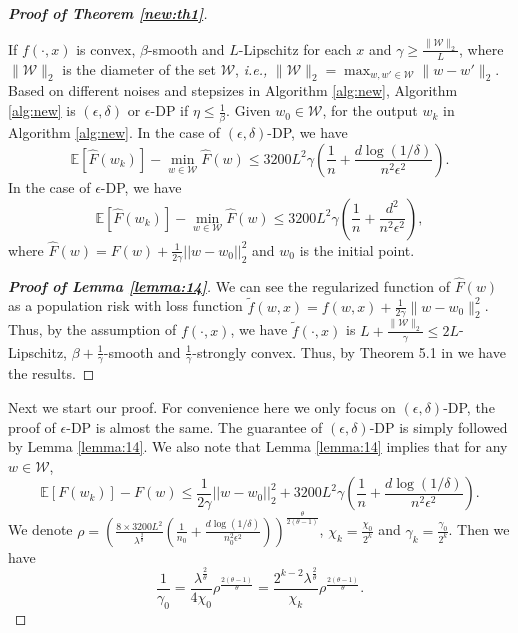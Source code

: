 \documentclass[12pt]{alt2022} %
\renewcommand{\tilde}{\widetilde}
\begin{document}
\begin{proof}[ {\bf Proof of Theorem \ref{new:th1}}]
	    \begin{lemma}\label{lemma:14}
	    If $f(\cdot, x)$ is  convex, $\beta$-smooth and $L$-Lipschitz for each $x$ and $\gamma \geq \frac{\|\mathcal{W}\|_2}{L}$, where $\|\mathcal{W}\|_2$ is the diameter of the set $\mathcal{W}$, {\em i.e.,} $\|\mathcal{W}\|_2=\max_{w, w'\in \mathcal{W}}\|w-w'\|_2$.  
	    Based on different noises and stepsizes in Algorithm \ref{alg:new},  Algorithm \ref{alg:new} is $(\epsilon, \delta)$ or $\epsilon$-DP if $\eta\leq \frac{1}{\beta}$. 
	   Given $w_0\in \mathcal{W}$, for the output $w_k$ in Algorithm \ref{alg:new}. In the case of $(\epsilon, \delta)$-DP, we have 
	    \begin{equation*}
	\mathbb{E}[\hat{F}(w_k)]-\min_{w\in \mathcal{W}} \hat{F}(w)\leq 3200L^2\gamma (\frac{1}{n}+\frac{d\log(1/\delta)}{n^2\epsilon^2 }). 
	    \end{equation*}
	  In the case of $\epsilon$-DP, we have 
	  	    \begin{equation*}
	\mathbb{E}[\hat{F}(w_k)]-\min_{w\in \mathcal{W}} \hat{F}(w)\leq 3200L^2\gamma (\frac{1}{n}+\frac{d^2}{n^2\epsilon^2 }), 
	    \end{equation*}
	    where $\hat{F}(w)=F(w)+\frac{1}{2\gamma}||w-w_0||_2^2$ and $w_0$ is the initial point.
	    \end{lemma}
	    \begin{proof}[{\bf Proof of Lemma \ref{lemma:14}}]
	    We can see the regularized  function of $\hat{F}(w)$ as a population risk with loss function $\tilde{f}(w, x)= f(w, x)+\frac{1}{2\gamma}\|w-w_0\|_2^2$. Thus, by the assumption of $f(\cdot, x)$, we have $\tilde{f}(\cdot, x)$ is $L+\frac{\|\mathcal{W}\|_2}{\gamma}\leq 2L$-Lipschitz, $\beta+\frac{1}{\gamma}$-smooth and $\frac{1}{\gamma}$-strongly convex. Thus, by Theorem 5.1 in \citep{feldman2020private} we have the results. 
	    
	    \end{proof}
	 Next we start our proof.  For convenience here we only focus on $(\epsilon, \delta)$-DP, the proof of $\epsilon$-DP is almost the same. The guarantee of $(\epsilon, \delta)$-DP is simply followed by Lemma \ref{lemma:14}.  We also note that Lemma \ref{lemma:14} implies that for any $w\in \mathcal{W}$,
	  \begin{equation}\label{eq21}
	\mathbb{E}[{F}(w_k)]- {F}(w)\leq \frac{1}{2\gamma}||w-w_0||_2^2+3200L^2\gamma (\frac{1}{n}+\frac{d\log(1/\delta)}{n^2\epsilon^2 }). 
	    \end{equation}
    We denote $\rho=(\frac{8\times 3200 L^2}{\lambda^\frac{2}{\theta}} (\frac{1}{n_0}+\frac{d\log(1/\delta)}{n_0^2\epsilon^2}))^\frac{\theta}{2(\theta-1)}$, $\chi_k=\frac{\chi_0}{2^k}$ and $\gamma_k=\frac{\gamma_0}{2^k}$. Then we have 
    \begin{equation}\label{eq:22}
        \frac{1}{\gamma_0}=\frac{\lambda^\frac{2}{\theta}}{4 \chi_0} \rho^ \frac{2(\theta-1)}{\theta}=\frac{2^{k-2}\lambda^\frac{2}{\theta}}{ \chi_k} \rho^ \frac{2(\theta-1)}{\theta} . 
    \end{equation}
    

\end{proof}
\end{document}
